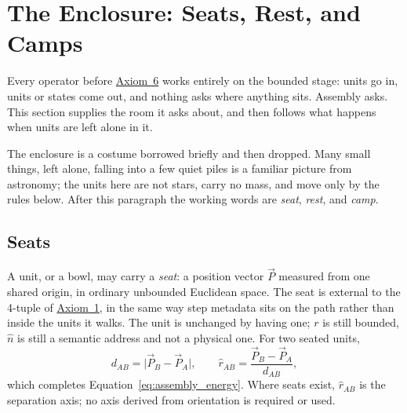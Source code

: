 \documentclass[12pt, a4paper]{article}
\begin{document}
\section{The Enclosure: Seats, Rest, and Camps}
\label{sec:enclosure}

Every operator before \hyperref[subsec:axiom_assembly]{Axiom~6} works
entirely on the bounded stage: units go in, units or states come
out, and nothing asks where anything sits. Assembly asks. This
section supplies the room it asks about, and then follows what
happens when units are left alone in it.

The enclosure is a costume borrowed briefly and then dropped. Many
small things, left alone, falling into a few quiet piles is a
familiar picture from astronomy; the units here are not stars, carry
no mass, and move only by the rules below. After this paragraph the
working words are \emph{seat}, \emph{rest}, and \emph{camp}.

\subsection{Seats}
\label{subsec:enclosure_seats}
A unit, or a bowl, may carry a \emph{seat}: a position vector
$\vec P$ measured from one shared origin, in ordinary unbounded
Euclidean space. The seat is external to the 4-tuple of
\hyperref[subsec:axiom1]{Axiom~1}, in the same way step metadata sits on the
path rather than inside the units it walks. The unit is unchanged by
having one; $r$ is still bounded, $\hat n$ is still a semantic
address and not a physical one. For two seated units,
\begin{equation}
    d_{AB} = \lvert \vec P_B - \vec P_A\rvert,
    \qquad
    \hat r_{AB} = \frac{\vec P_B - \vec P_A}{d_{AB}},
    \label{eq:enclosure_distance}
\end{equation}
which completes Equation~\eqref{eq:assembly_energy}. Where seats
exist, $\hat r_{AB}$ is the separation axis; no axis derived from
orientation is required or used.
\end{document}
